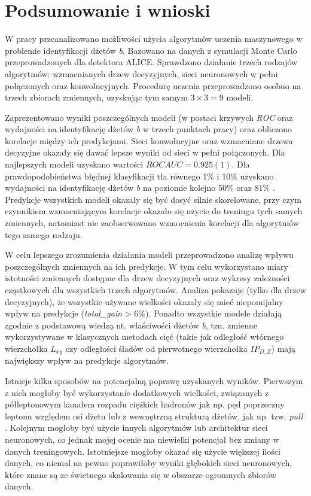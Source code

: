 \section{Podsumowanie i wnioski}
\label{sec:podsumowanie}

W pracy przeanalizowano możliwości użycia algorytmów uczenia maszynowego w problemie identyfikacji dżetów \textit{b}.
Bazowano na danych z symulacji Monte Carlo przeprowadzonych dla detektora ALICE.
Sprawdzono działanie trzech rodzajów algorytmów: wzmacnianych drzew decyzyjnych, sieci neuronowych w pełni połączonych oraz konwolucyjnych.
Procedurę uczenia przeprowadzono osobno na trzech zbiorach zmiennych, uzyskując tym samym $3\times3=9$ modeli. 

Zaprezentowano wyniki poszczególnych modeli (w postaci krzywych \textit{ROC} oraz wydajności na identyfikację  dżetów \textit{b} w trzech punktach pracy) oraz obliczono korelacje między ich predykcjami.
Sieci konwolucyjne oraz wzmacniane drzewa decyzyjne okazały się dawać lepsze wyniki od sieci w pełni połączonych.
Dla najlepszych modeli uzyskano wartości $ROC AUC = 0.925(1)$.
Dla prawdopodobieństwa błędnej klasyfikacji tła równego 1\% i 10\% uzyskano wydajności na identyfikację dżetów \textit{b} na poziomie kolejno 50\% oraz 81\% .
Predykcje wszystkich modeli okazały się być dosyć silnie skorelowane, przy czym czynnikiem wzmacniającym korelacje okazało się użycie do treningu tych samych zmiennych, natomiast nie zaobserwowano wzmocnienia korelacji dla algorytmów tego samego rodzaju.

W celu lepszego zrozumienia działania modeli przeprowadzono analizę wpływu poszczególnych zmiennych na ich predykcje. W tym celu wykorzystano miary istotności zmiennych dostępne dla drzew decyzyjnych oraz wykresy zależności cząstkowych dla wszystkich trzech algorytmów.
Analiza pokazuje (tylko dla drzew decyzyjnych), że wszystkie używane wielkości okazały się mieć niepomijalny wpływ na predykcje (\textit{total\_gain} > 6\%).
Ponadto wszystkie modele działają zgodnie z podstawową wiedzą nt. właściwości dżetów \textit{b}, tzn. zmienne wykorzystywane w klasycznych metodach cięć (takie jak odległość wtórnego wierzchołka $L_{xy}$ czy odległości śladów od pierwotnego wierzchołka $IP_{D,Z}$) mają największy wpływ na predykcje algorytmów. 

Istnieje kilka sposobów na potencjalną poprawę uzyskanych wyników. 
Pierwszym z nich mogłoby być wykorzystanie dodatkowych wielkości, związanych z półleptonowym kanałem rozpadu ciężkich hadronów jak np. pęd poprzeczny leptonu względem osi dżetu lub z wewnętrzną strukturą dżetów, jak np. tzw. \textit{pull} \cite{Gallicchio:2010sw}. 
Kolejnym mogłoby być użycie innych algorytmów lub architektur sieci neuronowych, co jednak mojej ocenie ma niewielki potencjał bez zmiany w danych treningowych.
Istotniejsze mogłoby okazać się użycie większej ilości danych, co niemal na pewno poprawiłoby wyniki głębokich sieci neuronowych, które znane są ze świetnego skalowania się w obszarze ogromnych zbiorów danych.


